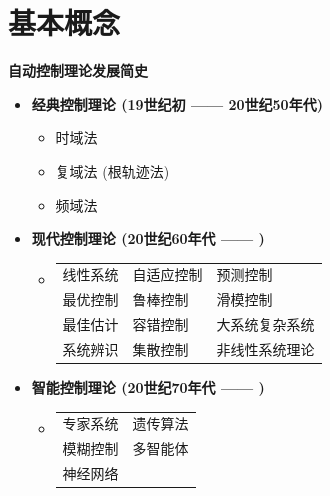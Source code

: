 \chapter{基本概念}
\begin{tcolorbox}[
    colback=blue!5,
    title=自动控制理论的发展
]
    \centering
    {\LARGE \bfseries \color{blue} 自动控制理论发展简史}
    \vspace{1cm}

    \begin{itemize}
        \item[\Large $\bullet$] {\Large \bfseries \color{cyan} 经典控制理论 \quad \small (19世纪初 —— 20世纪50年代)}
        \begin{itemize}
            \item 时域法
            \item 复域法 (根轨迹法)
            \item 频域法
        \end{itemize}
        
        \vspace{0.8cm}
        
        \item[\Large $\bullet$] {\Large \bfseries \color{cyan} 现代控制理论 \quad \small (20世纪60年代 —— )}
        \begin{itemize}
            \item[] \begin{tabular}{lll}
                线性系统 & 自适应控制 & 预测控制 \\
                最优控制 & 鲁棒控制 & 滑模控制 \\
                最佳估计 & 容错控制 & 大系统复杂系统 \\
                系统辨识 & 集散控制 & 非线性系统理论
            \end{tabular}
        \end{itemize}
        
        \vspace{0.8cm}
        
        \item[\Large $\bullet$] {\Large \bfseries \color{cyan} 智能控制理论 \quad \small (20世纪70年代 —— )}
        \begin{itemize}
            \item[] \begin{tabular}{ll}
                专家系统 & 遗传算法 \\
                模糊控制 & 多智能体 \\
                神经网络 & 
            \end{tabular}
        \end{itemize}
    \end{itemize}
    \vspace{0.5cm}
\end{tcolorbox}

